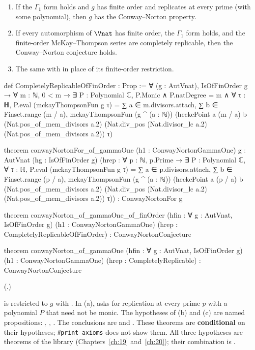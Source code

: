 \begin{theorem}\label{ch16:thm:bridge}
\begin{enumerate}[label=(\alph*)]
\item If the $\Gamma_1$ form holds and $g$ has finite order and replicates at every prime (with some polynomial), then
  $g$ has the Conway--Norton property.
\item If every automorphism of $\Vnat$ has finite order, the $\Gamma_1$ form holds, and the finite-order McKay--Thompson
  series are completely replicable, then the Conway--Norton conjecture holds.
\item The same with  in place of its finite-order restriction.
\end{enumerate}
\end{theorem}
\begin{leancode}
def CompletelyReplicableOfFinOrder : Prop :=
  ∀ (g : AutVnat), IsOfFinOrder g → ∀ m : ℕ, 0 < m → ∃ P : Polynomial ℂ, P.Monic ∧
    P.natDegree = m ∧ ∀ τ : ℍ, P.eval (mckayThompsonFun g τ) =
      ∑ a ∈ m.divisors.attach, ∑ b ∈ Finset.range (m / a),
        mckayThompsonFun (g ^ (a : ℕ)) (heckePoint a (m / a) b (Nat.pos_of_mem_divisors a.2)
          (Nat.div_pos (Nat.divisor_le a.2) (Nat.pos_of_mem_divisors a.2)) τ)

theorem conwayNortonFor_of_gammaOne (h1 : ConwayNortonGammaOne) {g : AutVnat}
    (hg : IsOfFinOrder g)
    (hrep : ∀ p : ℕ, p.Prime → ∃ P : Polynomial ℂ, ∀ τ : ℍ, P.eval (mckayThompsonFun g τ) =
      ∑ a ∈ p.divisors.attach, ∑ b ∈ Finset.range (p / a),
        mckayThompsonFun (g ^ (a : ℕ)) (heckePoint a (p / a) b (Nat.pos_of_mem_divisors a.2)
          (Nat.div_pos (Nat.divisor_le a.2) (Nat.pos_of_mem_divisors a.2)) τ)) :
    ConwayNortonFor g

theorem conwayNorton_of_gammaOne_of_finOrder (hfin : ∀ g : AutVnat, IsOfFinOrder g)
    (h1 : ConwayNortonGammaOne) (hrep : CompletelyReplicableOfFinOrder) :
    ConwayNortonConjecture

theorem conwayNorton_of_gammaOne (hfin : ∀ g : AutVnat, IsOfFinOrder g)
    (h1 : ConwayNortonGammaOne) (hrep : CompletelyReplicable) : ConwayNortonConjecture
\end{leancode}
(.)
\begin{dictionary}
 is  restricted to $g$ with .
In (a),  asks for replication at every prime $p$ with a polynomial $P$ that need not be monic.  The
hypotheses of (b) and (c) are named propositions: , ,
.  The conclusions are  and .  These theorems are
\textbf{conditional} on their hypotheses; \texttt{\#print axioms} does not show them.  All three hypotheses are
theorems of the library (Chapters~\ref{ch:19} and~\ref{ch:20}); their combination is .
\end{dictionary}
